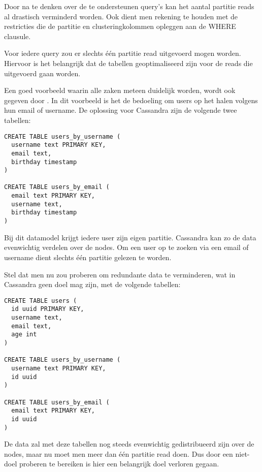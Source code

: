 Door na te denken over de te ondersteunen query's kan het aantal partitie reads al drastisch verminderd worden.
Ook dient men rekening te houden met de restricties die de partitie en clusteringkolommen opleggen aan de WHERE clausule.

Voor iedere query zou er slechts één partitie read uitgevoerd mogen worden.
Hiervoor is het belangrijk dat de tabellen geoptimaliseerd zijn voor de reads die uitgevoerd gaan worden.

Een goed voorbeeld waarin alle zaken meteen duidelijk worden, wordt ook gegeven door \cite{Hobbs2015Datamodelling} .
In dit voorbeeld is het de bedoeling om users op het halen volgens hun email of username.
De oplossing voor Cassandra zijn de volgende twee tabellen:

\begin{lstlisting}
CREATE TABLE users_by_username (
  username text PRIMARY KEY,
  email text,
  birthday timestamp
)

CREATE TABLE users_by_email (
  email text PRIMARY KEY,
  username text,
  birthday timestamp
)
\end{lstlisting}

Bij dit datamodel krijgt iedere user zijn eigen partitie.
Cassandra kan zo de data evenwichtig verdelen over de nodes.
Om een user op te zoeken via een email of username dient slechts één partitie gelezen te worden.

Stel dat men nu zou proberen om redundante data te verminderen, wat in Cassandra geen doel mag zijn, met de volgende tabellen:

\begin{lstlisting}
CREATE TABLE users (
  id uuid PRIMARY KEY,
  username text,
  email text,
  age int
)

CREATE TABLE users_by_username (
  username text PRIMARY KEY,
  id uuid
)

CREATE TABLE users_by_email (
  email text PRIMARY KEY,
  id uuid
)
\end{lstlisting}

De data zal met deze tabellen nog steeds evenwichtig gedistribueerd zijn over de nodes, maar nu moet men meer dan één partitie read doen.
Dus door een niet-doel proberen te bereiken is hier een belangrijk doel verloren gegaan.